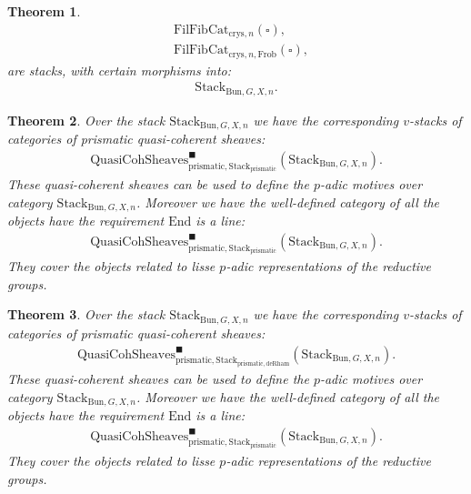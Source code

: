 \documentclass[12pt]{article}
\newtheorem{theorem}{Theorem}
\theoremstyle{definition}
\begin{document}
\begin{theorem}
\begin{align}
&\mathrm{FilFibCat}_{\mathrm{crys},n}(\square),\\
&\mathrm{FilFibCat}_{\mathrm{crys},n,\mathrm{Frob}}(\square),
\end{align} 
are stacks, with certain morphisms into:
\begin{align}
\mathrm{Stack}_{\mathrm{Bun},G,X,n}.
\end{align}
\end{theorem}

\begin{theorem}
Over the stack $\mathrm{Stack}_{\mathrm{Bun},G,X,n}$ we have the corresponding $v$-stacks of categories of prismatic quasi-coherent sheaves:
\begin{align}
\mathrm{QuasiCohSheaves}^\blacksquare_{\mathrm{prismatic},\mathrm{Stack}_{\mathrm{prismatic}}}(\mathrm{Stack}_{\mathrm{Bun},G,X,n}).
\end{align}
These quasi-coherent sheaves can be used to define the $p$-adic motives over category $\mathrm{Stack}_{\mathrm{Bun},G,X,n}$. Moreover we have the well-defined category of all the objects have the requirement $\mathrm{End}$ is a line:
\begin{align}
\mathrm{QuasiCohSheaves}^\blacksquare_{\mathrm{prismatic},\mathrm{Stack}_{\mathrm{prismatic}}}(\mathrm{Stack}_{\mathrm{Bun},G,X,n}).
\end{align}
They cover the objects related to lisse $p$-adic representations of the reductive groups.
\end{theorem}

\begin{theorem}
Over the stack $\mathrm{Stack}_{\mathrm{Bun},G,X,n}$ we have the corresponding $v$-stacks of categories of prismatic quasi-coherent sheaves:
\begin{align}
\mathrm{QuasiCohSheaves}^\blacksquare_{\mathrm{prismatic},\mathrm{Stack}_{\mathrm{prismatic},\mathrm{deRham}}}(\mathrm{Stack}_{\mathrm{Bun},G,X,n}).
\end{align}
These quasi-coherent sheaves can be used to define the $p$-adic motives over category $\mathrm{Stack}_{\mathrm{Bun},G,X,n}$. Moreover we have the well-defined category of all the objects have the requirement $\mathrm{End}$ is a line:
\begin{align}
\mathrm{QuasiCohSheaves}^\blacksquare_{\mathrm{prismatic},\mathrm{Stack}_{\mathrm{prismatic}}}(\mathrm{Stack}_{\mathrm{Bun},G,X,n}).
\end{align}
They cover the objects related to lisse $p$-adic representations of the reductive groups.
\end{theorem}
\end{document}
